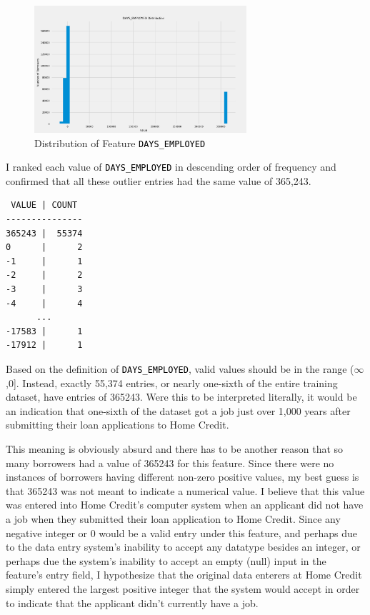 \documentclass[12pt, letterpaper]{article}
\begin{document}
\begin{figure}[ht]
\includegraphics[width=0.7\textwidth]{distribDAYSEMPLOYED}
\centering
\caption{Distribution of Feature \colorbox{backcolor}{\textcolor{black}{\texttt{DAYS_EMPLOYED}}}}
\end{figure}

I ranked each value of \colorbox{backcolor}{\textcolor{black}{\texttt{DAYS_EMPLOYED}}} in descending order of frequency and confirmed that all these outlier entries had the same value of 365,243.

\begin{lstlisting}
 VALUE | COUNT
---------------
365243 |  55374
0      |      2
-1     |      1
-2     |      2
-3     |      3
-4     |      4
      ...
-17583 |      1
-17912 |      1
\end{lstlisting}

Based on the definition of \colorbox{backcolor}{\textcolor{black}{\texttt{DAYS_EMPLOYED}}}, valid values should be in the range ($\infty$,0]. Instead, exactly 55,374 entries, or nearly one-sixth of the entire training dataset, have entries of 365243. Were this to be interpreted literally, it would be an indication that one-sixth of the dataset got a job just over 1,000 years after submitting their loan applications to Home Credit.

This meaning is obviously absurd and there has to be another reason that so many borrowers had a value of 365243 for this feature. Since there were no instances of borrowers having different non-zero positive values, my best guess is that 365243 was not meant to indicate a numerical value. I believe that this value was entered into Home Credit's computer system when an applicant did not have a job when they submitted their loan application to Home Credit. Since any negative integer or 0 would be a valid entry under this feature, and perhaps due to the data entry system's inability to accept any datatype besides an integer, or perhaps due the system's inability to accept an empty (null) input in the feature's entry field, I hypothesize that the original data enterers at Home Credit simply entered the largest positive integer that the system would accept in order to indicate that the applicant didn't currently have a job.
\end{document}
